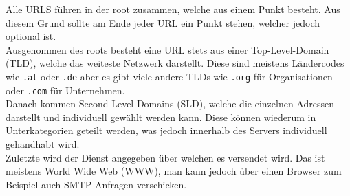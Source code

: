 \documentclass{article}
\begin{document}
	 Alle URLS führen in der root zusammen, welche aus einem Punkt besteht. Aus diesem Grund sollte am Ende jeder URL ein Punkt stehen, welcher jedoch optional ist. \\
	 Ausgenommen des roots besteht eine URL stets aus einer Top-Level-Domain (TLD), welche das weiteste Netzwerk darstellt. Diese sind meistens Ländercodes wie \verb|.at| oder \verb|.de| aber es gibt viele andere TLDs wie \verb|.org| für Organisationen oder \verb|.com| für Unternehmen. \\
	 Danach kommen Second-Level-Domains (SLD), welche die einzelnen Adressen darstellt und individuell gewählt werden kann. Diese können wiederum in Unterkategorien geteilt werden, was jedoch innerhalb des Servers individuell gehandhabt wird. \\
	 Zuletzte wird der Dienst angegeben über welchen es versendet wird. Das ist meistens World Wide Web (WWW), man kann jedoch über einen Browser zum Beispiel auch SMTP Anfragen verschicken. \\
\end{document}
